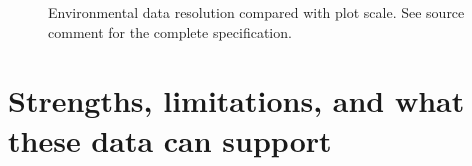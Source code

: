 \begin{figure}[!htbp]
\centering
{}
\caption{Environmental data resolution compared with plot scale. See source comment for the
complete specification.}
\label{fig:data-resolution}
\end{figure}

\section{Strengths, limitations, and what these data can support}
\label{sec:data-strengths-limitations}

